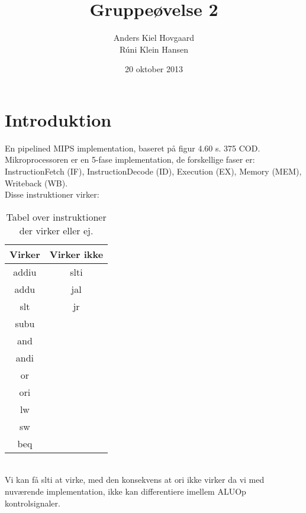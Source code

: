 \documentclass[12pt,a4paper,danish]{article}
\begin{document}
\title{Gruppeøvelse 2}
\author{Anders Kiel Hovgaard\\Rúni Klein Hansen}
\date{20 oktober 2013}
\maketitle

\section{Introduktion}
En pipelined MIPS implementation, baseret på figur 4.60 s. 375 COD.\\
Mikroprocessoren er en 5-fase implementation, de forskellige faser er:
\textsf{InstructionFetch (IF), InstructionDecode (ID), Execution (EX), Memory (MEM),
Writeback (WB)}.\\ 
Disse instruktioner virker:
\begin{table}[h!]
  \centering
  \begin{tabular}{c|c}
    Virker& Virker ikke \\\hline
    addiu & slti        \\
    addu  & jal         \\
    slt   & jr          \\
    subu  &             \\
    and   &             \\
    andi  &             \\
    or    &             \\
    ori   &             \\
    lw    &             \\
    sw    &             \\
    beq   &             \\
  \end{tabular}
  \caption{Tabel over instruktioner der virker eller ej.}
  \label{tab:instr}
\end{table}
\\
Vi kan få \textsf{slti} at virke, med den konsekvens at \textsf{ori} ikke
virker da vi med nuværende implementation, ikke kan differentiere imellem ALUOp
kontrolsignaler. 
\end{document}
